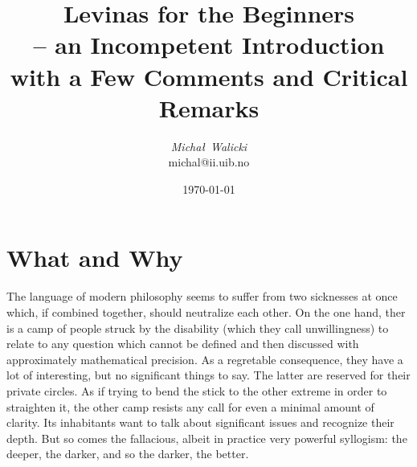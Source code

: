 
\newcommand{\qpa}[1]{[???\hspace*{1em} {\em #1}\hspace*{1em} ???]}
\newcommand{\lev}[1]{{\sf{#1}}}
\newcommand{\prg}[1]{\vspace*{1.5ex}\par\noindent{\lev{#1.}}\par }

\newcommand{\quo}[1]{``{\em #1\/}''}
\newcommand{\comment}[1]{\\[1ex] {\small{$\lceil$#1$\rfloor$}}\\[1ex]}

\newcommand{\MyLPar}{\parsep -.2ex plus.2ex minus.2ex\itemsep\parsep
   \vspace{-\topsep}\vspace{.5ex}}



\title{Levinas for the Beginners \\ 
  {\normalsize{-- an Incompetent Introduction}} \vspace*{-1ex}\\ 
  {\normalsize{with a Few Comments and Critical Remarks}} }
\author{ %
{\em Micha{\l}\ Walicki} \\ {\small{michal@ii.uib.no}}}

\date{\hfill\small\today}  %
\maketitle 
\vspace*{-5ex}\section{What and Why}
The language of modern philosophy seems to suffer from two sicknesses at once which, if combined
together, should neutralize each other. On the one hand, ther is a camp of people struck by the
disability (which they call unwillingness) to 
relate to any question which cannot be defined and then discussed with approximately 
mathematical precision. As a regretable consequence, they have a lot of interesting,
but no significant things to say. The latter are reserved for their private circles.
%
As if trying to bend the stick to the other extreme in order to straighten it, the
other camp
resists any call for even a minimal amount of clarity. Its inhabitants want to talk about significant 
issues and
recognize their depth. But so comes the fallacious, albeit in practice very powerful
syllogism: the deeper, the darker, and so the darker, the better.

